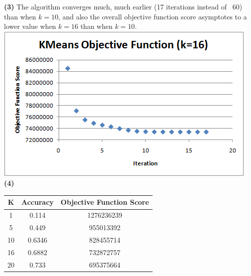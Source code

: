 \documentclass[11pt]{article}
\renewcommand{\part}[1] {\vspace{.10in} {\bf (#1)}}
\begin{document}
\part{3}
The algorithm converges much, much earlier (17 iterations instead of ~60) than when $k=10$, and also the overall objective function score asymptotes to a lower value when $k=16$ than when $k=10$.\\
\includegraphics{q4c.png}\\

\part{4}
\begin{table}
    \begin{tabular}{|c|c|c|}
        \hline
        K  & Accuracy & Objective Function Score \\ \hline
        1  & 0.114    & 1276236239               \\ 
        5  & 0.449    & 955013392                \\ 
        10 & 0.6346   & 828455714                \\ 
        16 & 0.6882   & 732872757                \\ 
        20 & 0.733    & 695375664                \\
        \hline
    \end{tabular}
\end{table}
\end{document}
